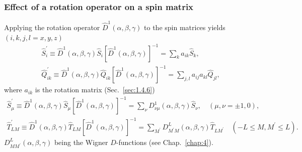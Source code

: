 \subsubsection{Effect of a rotation operator on a spin matrix}

Applying the rotation operator $\widehat{D}^{1}(\alpha, \beta, \gamma)$ to the spin matrices yields $(i, k, j, l=x, y, z)$
\begin{gather}
\widehat{S}_{i}^{\prime} \equiv \widehat{D}^{1}(\alpha, \beta, \gamma) \widehat{S}_{i}\left[\widehat{D}^{1}(\alpha, \beta, \gamma)\right]^{-1}=\sum_{k} a_{i k} \widehat{S}_{k} , \label{eq:2:6:85}\\
\widehat{Q}_{i k}^{\prime} \equiv \widehat{D}^{1}(\alpha, \beta, \gamma) \widehat{Q}_{i k}\left[\widehat{D}^{1}(\alpha, \beta, \gamma)\right]^{-1}=\sum_{j, l} a_{i j} a_{k l} \widehat{Q}_{j l} ,\label{eq:2:6:86}
\end{gather}
where $a_{i k}$ is the rotation matrix (Sec.~\ref{sec:1.4.6})
\begin{gather}
\widehat{S}_{\mu}^{\prime} \equiv \widehat{D}^{1}(\alpha, \beta, \gamma) \widehat{S}_{\mu}\left[\widehat{D}^{1}(\alpha, \beta, \gamma)\right]^{-1}=\sum_{\nu} D_{\nu \mu}^{1}(\alpha, \beta, \gamma) \widehat{S}_{\nu}, \quad(\mu, \nu= \pm 1,0) , \label{eq:2:6:87}\\
\widehat{T}_{L M}^{\prime} \equiv \widehat{D}^{1}(\alpha, \beta, \gamma) \widehat{T}_{L M}\left[\widehat{D}^{1}(\alpha, \beta, \gamma)\right]^{-1}=\sum_{M^{\prime}} D_{M^{\prime} M}^{L}(\alpha, \beta, \gamma) \widehat{T}_{L M^{\prime}} \quad\left(-L \leq M, M^{\prime} \leq L\right). \label{eq:2:6:88}
\end{gather}
$D_{M M^{\prime}}^{L}(\alpha, \beta, \gamma)$ being the Wigner $D$-functions (see Chap.~\ref{chap:4}).

